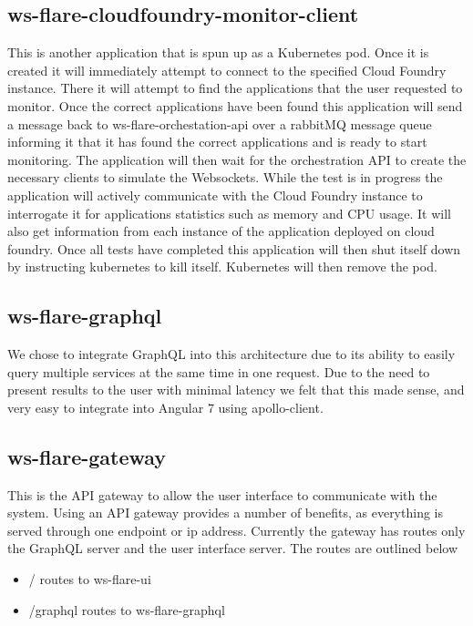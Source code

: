 \subsection{ws-flare-cloudfoundry-monitor-client}

This is another application that is spun up as a Kubernetes pod. Once it is created it will immediately attempt to connect to the specified Cloud Foundry instance. There it will attempt to find the applications that the user requested to monitor. Once the correct applications have been found this application will send a message back to ws-flare-orchestation-api over a rabbitMQ message queue informing it that it has found the correct applications and is ready to start monitoring. The application will then wait for the orchestration API to create the necessary clients to simulate the Websockets. While the test is in progress the application will actively communicate with the Cloud Foundry instance to interrogate it for applications statistics such as memory and CPU usage. It will also get information from each instance of the application deployed on cloud foundry. Once all tests have completed this application will then shut itself down by instructing kubernetes to kill itself. Kubernetes will then remove the pod.

\subsection{ws-flare-graphql}

We chose to integrate GraphQL into this architecture due to its ability to easily query multiple services at the same time in one request. Due to the need to present results to the user with minimal latency we felt that this made sense, and very easy to integrate into Angular 7 using apollo-client. 

\subsection{ws-flare-gateway}

This is the API gateway to allow the user interface to communicate with the system. Using an API gateway provides a number of benefits, as everything is served through one endpoint or ip address. Currently the gateway has routes only the GraphQL server and the user interface server. The routes are outlined below

\begin{itemize}
  \item / routes to ws-flare-ui
  \item /graphql routes to ws-flare-graphql
\end{itemize}

